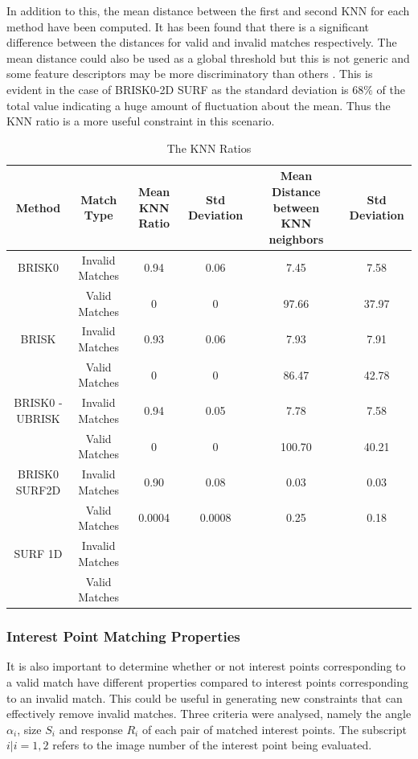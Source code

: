 \documentclass{article}
\begin{document}
In addition to this, the mean distance between the first and second KNN for each method have been computed. It has been found that there is a significant difference between the distances for valid and invalid matches respectively. The mean distance could also be used as a global threshold but this is not generic and some feature descriptors may be more discriminatory than others \cite{Lowe2004}. This is evident in the case of BRISK0-2D SURF as the standard deviation is $68\%$ of the total value indicating a huge amount of fluctuation about the mean. Thus the KNN ratio is a more useful constraint in this scenario.\\

\begin{table}
\caption{The KNN Ratios}
\begin{tabular}{|c|c|c|c|c|c|}
\hline 
Method & Match Type & Mean KNN Ratio & Std Deviation & Mean Distance between KNN neighbors & Std Deviation\tabularnewline
\hline 
\hline 
BRISK0 & Invalid Matches & 0.94 & 0.06 & 7.45 & 7.58\tabularnewline
\hline 
 & Valid Matches & 0 & 0 & 97.66 & 37.97\tabularnewline
\hline 
BRISK & Invalid Matches & 0.93 & 0.06 & 7.93 & 7.91\tabularnewline
\hline 
 & Valid Matches & 0 & 0 & 86.47 & 42.78\tabularnewline
\hline 
BRISK0 - UBRISK & Invalid Matches & 0.94 & 0.05 & 7.78 & 7.58\tabularnewline
\hline 
 & Valid Matches & 0 & 0 & 100.70 & 40.21\tabularnewline
\hline 
BRISK0 SURF2D & Invalid Matches & 0.90 & 0.08 & 0.03 & 0.03\tabularnewline
\hline 
 & Valid Matches & 0.0004 & 0.0008 & 0.25 & 0.18\tabularnewline
\hline 
SURF 1D & Invalid Matches &  &  &  & \tabularnewline
\hline 
 & Valid Matches &  &  &  & \tabularnewline
\hline 
\end{tabular}
\label{tab:knnCriterion}
\end{table}




\subsubsection{Interest Point Matching Properties}
\label{sec:keypointMatching}
It is also important to determine whether or not interest points corresponding to a valid match have different properties compared to interest points corresponding to an invalid match. This could be useful in generating new constraints that can effectively remove invalid matches. Three criteria were analysed, namely the angle $\alpha_i$, size $S_i$ and response $R_i$ of each pair of matched interest points. The subscript $i|i={1,2}$ refers to the image number of the interest point being evaluated.\\
\end{document}
